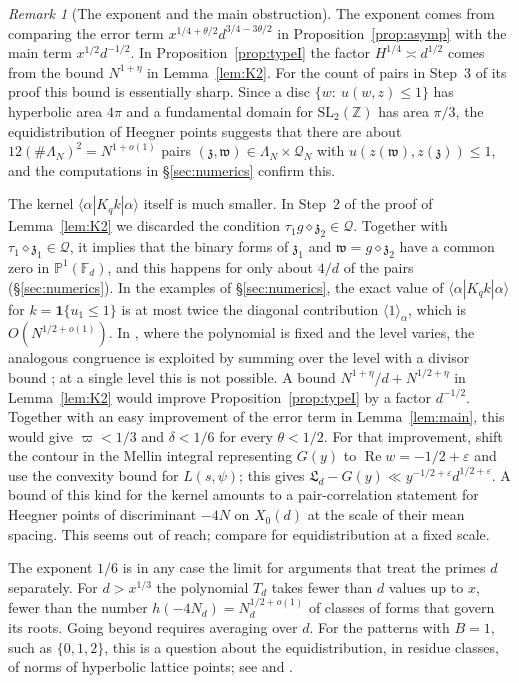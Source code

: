 \documentclass[11pt]{amsart}
\theoremstyle{remark}
\newtheorem{remark}[theorem]{Remark}
\theoremstyle{definition}
\numberwithin{equation}{section}
\newcommand{\Qc}{\mathcal{Q}}
\newcommand{\Z}{\mathbb{Z}}
\newcommand{\eps}{\varepsilon}
\newcommand{\Lf}{\mathfrak{L}}
\newcommand{\gz}{\mathfrak{z}}
\newcommand{\gw}{\mathfrak{w}}
\newcommand{\SL}{\mathrm{SL}}
\newcommand{\one}{\mathbf{1}}
\newcommand{\br}[1]{\langle #1\rangle}
\begin{document}
\begin{remark}[The exponent and the main obstruction]\label{rem:exponent}
The exponent comes from comparing the error term $x^{1/4+\theta/2}d^{3/4-3\theta/2}$ in Proposition~\ref{prop:asymp} with the main term $x^{1/2}d^{-1/2}$. In Proposition~\ref{prop:typeI} the factor $H^{1/4}\asymp d^{1/2}$ comes from the bound $N^{1+\eta}$ in Lemma~\ref{lem:K2}. For the count of pairs in Step~3 of its proof this bound is essentially sharp. Since a disc $\{w:\ u(w,z)\le1\}$ has hyperbolic area $4\pi$ and a fundamental domain for $\SL_2(\Z)$ has area $\pi/3$, the equidistribution of Heegner points \cite{Du88} suggests that there are about $12(\#\Lambda_N)^2=N^{1+o(1)}$ pairs $(\gz,\gw)\in\Lambda_N\times\Qc_N$ with $u(z(\gw),z(\gz))\le1$, and the computations in \S\ref{sec:numerics} confirm this.

The kernel $\br{\alpha|K_qk|\alpha}$ itself is much smaller. In Step~2 of the proof of Lemma~\ref{lem:K2} we discarded the condition $\tau_1g\diamond\gz_2\in\Qc$. Together with $\tau_1\diamond\gz_1\in\Qc$, it implies that the binary forms of $\gz_1$ and $\gw=g\diamond\gz_2$ have a common zero in $\mathbb P^1(\mathbb F_d)$, and this happens for only about $4/d$ of the pairs (\S\ref{sec:numerics}). In the examples of \S\ref{sec:numerics}, the exact value of $\br{\alpha|K_qk|\alpha}$ for $k=\one\{u_1\le1\}$ is at most twice the diagonal contribution $\br{1}_\alpha$, which is $O(N^{1/2+o(1)})$. In \cite{GM}, where the polynomial is fixed and the level varies, the analogous congruence is exploited by summing over the level with a divisor bound \cite[Proposition~4.1]{GM}; at a single level this is not possible. A bound $N^{1+\eta}/d+N^{1/2+\eta}$ in Lemma~\ref{lem:K2} would improve Proposition~\ref{prop:typeI} by a factor $d^{-1/2}$. Together with an easy improvement of the error term in Lemma~\ref{lem:main}, this would give $\varpi<1/3$ and $\delta<1/6$ for every $\theta<1/2$. For that improvement, shift the contour in the Mellin integral representing $G(y)$ to $\operatorname{Re}w=-1/2+\eps$ and use the convexity bound for $L(s,\psi)$; this gives $\Lf_d-G(y)\ll y^{-1/2+\eps}d^{1/2+\eps}$. A bound of this kind for the kernel amounts to a pair-correlation statement for Heegner points of discriminant $-4N$ on $X_0(d)$ at the scale of their mean spacing. This seems out of reach; compare \cite{Du88} for equidistribution at a fixed scale.

The exponent $1/6$ is in any case the limit for arguments that treat the primes $d$ separately. For $d>x^{1/3}$ the polynomial $T_d$ takes fewer than $d$ values up to $x$, fewer than the number $h(-4N_d)=N_d^{1/2+o(1)}$ of classes of forms that govern its roots. Going beyond requires averaging over $d$. For the patterns with $B=1$, such as $\{0,1,2\}$, this is a question about the equidistribution, in residue classes, of norms of hyperbolic lattice points; see \cite[Remarks~8.1 and~8.5]{I} and \cite{FI09}.
\end{remark}
\end{document}
